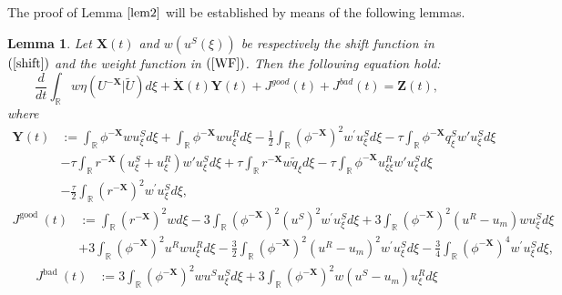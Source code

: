 \documentclass[10pt,reqno]{amsart}
\numberwithin{equation}{section}
\newtheorem{lemma}[theorem]{Lemma}
\begin{document}
	The proof of Lemma $\ref{lem2}$ will be established by means of the following lemmas.
	\begin{lemma}\label{lem2.5}
		Let $\mathbf{X}(t)$ and $w(u^{S}(\xi))$ be respectively the shift function in $(\ref{shift})$ and the weight function in $(\ref{WF})$. Then the following equation hold:
		\begin{equation}\label{yds} 
			\frac{d}{dt} \int_{\mathbb{R}} w \eta(U^{-\mathbf{X}}|\tilde{U}) d\xi + \dot{\mathbf{X}}(t)\mathbf{Y}(t) + J^{good}(t) + J^{bad}(t) = \mathbf{Z}(t), 
		\end{equation}
		where
		\small
		\begin{equation*} 
			\begin{aligned}
				\mathbf{Y}(t) &:= \int_{\mathbb{R}} \phi^{-\mathbf{X}} w u_{\xi}^{S} d \xi+\int_{\mathbb{R}} \phi^{-\mathbf{X}} w u_{\xi}^{R} d \xi-\frac{1}{2} \int_{\mathbb{R}}\left(\phi^{-\mathbf{X}}\right)^{2} w^{\prime} u_{\xi}^{S} d \xi-\tau\int_{\mathbb{R}}\phi^{-\mathbf{X}}q_{\xi}^{S}w'u_{\xi}^{S}d\xi\\
				&-\tau \int_{\mathbb{R}}r^{-\mathbf{X}}\left(u_{\xi}^{S}+u_{\xi}^{R}\right)w'u_{\xi}^{S}d\xi+\tau\int_{\mathbb{R}}r^{-\mathbf{X}}w\tilde{q}_{\xi}d\xi-\tau\int_{\mathbb{R}}\phi^{-\mathbf{X}}u_{\xi\xi}^{R}w'u_{\xi}^{S}d\xi\\
				&-\frac{\tau}{2}\int_{\mathbb{R}}\left(r^{-\mathbf{X}}\right)^{2} w^{\prime} u_{\xi}^{S} d \xi,
			    \end{aligned}
			\end{equation*}
			\begin{equation*}
				\begin{aligned}
				J^{\text {good }}(t)&:=\int_{\mathbb{R}} \left(r^{-\mathbf{X}}\right)^{2} w d\xi-3\int_{\mathbb{R}}\left(\phi^{-\mathbf{X}}\right)^{2}\left(u^{S}\right)^{2} w^{\prime} u_{\xi}^{S} d \xi+3\int_{\mathbb{R}}\left(\phi^{-\mathbf{X}}\right)^{2}\left(u^{R}-u_{m}\right) w u_{\xi}^{S} d \xi\\
				&+3 \int_{\mathbb{R}}\left(\phi^{-\mathbf{X}}\right)^{2} u^{R} w u_{\xi}^{R} d \xi-\frac{3}{2} \int_{\mathbb{R}}\left(\phi^{-\mathbf{X}}\right)^{2}\left(u^{R}-u_{m}\right)^{2} w^{\prime} u_{\xi}^{S} d \xi-\frac{3}{4} \int_{\mathbb{R}}\left(\phi^{-\mathbf{X}}\right)^{4} w^{\prime} u_{\xi}^{S} d \xi,
		    	\end{aligned}
	     	\end{equation*}
	        \begin{equation*}
	            \begin{aligned}
				J^{\text {bad }}(t)&:=3 \int_{\mathbb{R}}\left(\phi^{-\mathbf{X}}\right)^{2} w u^{S} u_{\xi}^{S} d \xi+3 \int_{\mathbb{R}}\left(\phi^{-\mathbf{X}}\right)^{2} w\left(u^{S}-u_{m}\right) u_{\xi}^{R} d \xi\\

\end{aligned}
\end{equation*}
\end{lemma}
\end{document}
